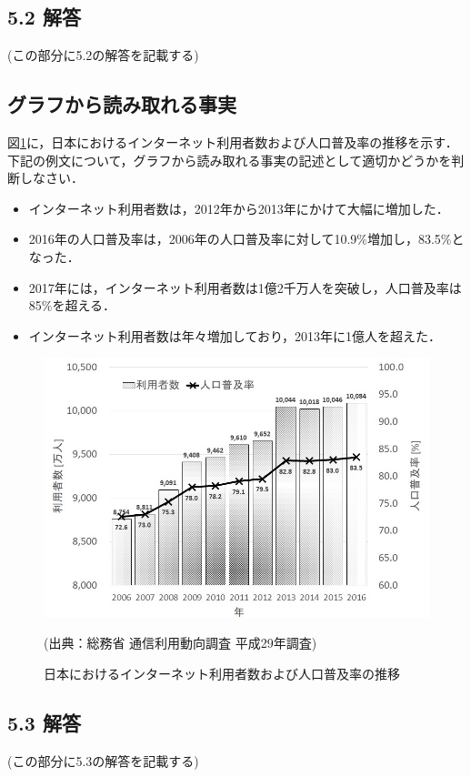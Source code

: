 \documentclass[11pt, a4paper]{jsarticle}
\begin{document}
\subsection*{5.2 解答}
(この部分に5.2の解答を記載する)

\newpage
\subsection{グラフから読み取れる事実}
図\ref{fig:arai}に，日本におけるインターネット利用者数および人口普及率の推移を示す．下記の例文について，グラフから読み取れる事実の記述として適切かどうかを判断しなさい．
\begin{itemize}
\item[(1)] インターネット利用者数は，2012年から2013年にかけて大幅に増加した．
\item[(2)] 2016年の人口普及率は，2006年の人口普及率に対して10.9$\%$増加し，83.5$\%$となった．
\item[(3)] 2017年には，インターネット利用者数は1億2千万人を突破し，人口普及率は85$\%$を超える．
\item[(4)] インターネット利用者数は年々増加しており，2013年に1億人を超えた．
\end{itemize}
\hspace{1em}

\begin{figure}[h]
\vspace{-5mm}
\centering
\includegraphics[width=0.9\linewidth]{internet.jpg}
\caption{日本におけるインターネット利用者数および人口普及率の推移}(出典：総務省 通信利用動向調査 平成29年調査)
\label{fig:arai}
\end{figure}
\subsection*{5.3 解答}
(この部分に5.3の解答を記載する)
\end{document}
